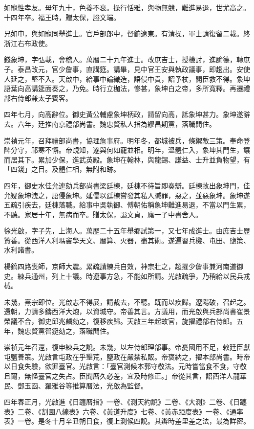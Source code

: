 \begin{pinyinscope}
如寵性孝友。母年九十，色養不衰。操行恬雅，與物無競，難進易退，世尤高之。十四年卒。福王時，贈太保，謚文端。

兄如申，與如寵同舉進士。官戶部郎中，督餉遼東。有清操，軍士請復留二載。終浙江右布政使。

錢象坤，字弘載，會稽人。萬曆二十九年進士。改庶吉士，授檢討，進諭德，轉庶子。泰昌改元，官少詹事，直講筵。講畢，見中官王安與執政議事，即趨出。安使人延之，堅不入。天啟中，給事中論織造，語侵中貴，詔予杖，閣臣救不得。象坤語葉向高講筵面奏之，乃免。時行立枷法，慘甚，象坤白之帝，多所寬釋。再遷禮部右侍郎兼太子賓客。

四年七月，向高辭位。御史黃公輔慮象坤柄政，請留向高，詆象坤甚力。象坤遂辭去。六年，廷推南京禮部尚書。魏忠賢私人指為繆昌期黨，落職閒住。

崇禎元年，召拜禮部尚書，協理詹事府。明年冬，都城被兵，條禦敵三策。奉命登陴分守，祁寒不懈。帝覘知，遂與何如寵並相。明年，溫體仁入，象坤其門生，讓而居其下。累加少保，進武英殿。象坤在翰林，與龍錫、謙益、士升並負物望，有「四錢」之目。及體仁相，無附和跡。

四年，御史水佳允連劾兵部尚書梁廷棟，廷棟不待旨即奏辯。廷棟故出象坤門，佳允疑象坤洩之，語侵象坤。延儒以廷棟嘗發其私人贓罪，惡之，並惡象坤。象坤遂五疏引疾去，廷棟落職。給事中吳執御、傅朝佑稱象坤難進易退，不當以門生累，不聽。家居十年，無病而卒。贈太保，謚文貞，廕一子中書舍人。

徐光啟，字子先，上海人。萬歷二十五年舉鄉試第一，又七年成進士。由庶吉士歷贊善。從西洋人利瑪竇學天文、曆算、火器，盡其術。遂遍習兵機、屯田、鹽策、水利諸書。

楊鎬四路喪師，京師大震。累疏請練兵自效，神宗壯之，超擢少詹事兼河南道御史。練兵通州，列上十議。時遼事方急，不能如所請。光啟疏爭，乃稍給以民兵戎械。

未幾，熹宗即位。光啟志不得展，請裁去，不聽。既而以疾歸。遼陽破，召起之。還朝，力請多鑄西洋大炮，以資城守。帝善其言。方議用，而光啟與兵部尚書崔景榮議不合，御史邱兆麟劾之，復移疾歸。天啟三年起故官，旋擢禮部右侍郎。五年，魏忠賢黨智鋌劾之，落職閒住。

崇禎元年召還，復申練兵之說。未幾，以左侍郎理部事。帝憂國用不足，敕廷臣獻屯鹽善策。光啟言屯政在乎墾荒，鹽政在嚴禁私販。帝褒納之，擢本部尚書。時帝以日食失驗，欲罪臺官。光啟言：「臺官測候本郭守敬法。元時嘗當食不食，守敬且爾，無怪臺官之失占。臣聞曆久必差，宜及時修正。」帝從其言，詔西洋人龍華民、鄧玉函、羅雅谷等推算曆法，光啟為監督。

四年春正月，光啟進《日躔曆指》一卷、《測天約說》二卷、《大測》二卷、《日躔表》二卷、《割圜八線表》六卷、《黃道升度》七卷、《黃赤距度表》一卷、《通率表》一卷。是冬十月辛丑朔日食，復上測候四說。其辯時差里差之法，最為詳密。


\end{pinyinscope}

